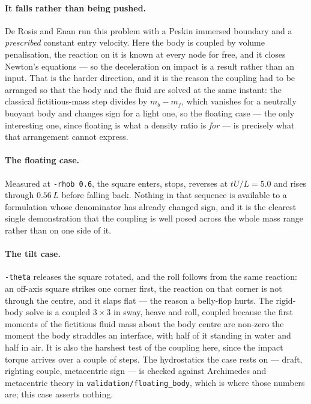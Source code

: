 \documentclass[11pt,a4paper]{article}
\newcommand{\code}[1]{\texttt{\small #1}}
\begin{document}
\paragraph{It falls rather than being pushed.} De Rosis and Enan run this
problem with a Peskin immersed boundary and a \emph{prescribed} constant entry
velocity. Here the body is coupled by volume penalisation, the reaction on it is
known at every node for free, and it closes Newton's equations --- so the
deceleration on impact is a result rather than an input. That is the harder
direction, and it is the reason the coupling had to be arranged so that the body
and the fluid are solved at the same instant: the classical fictitious-mass step
divides by $m_b - m_f$, which vanishes for a neutrally buoyant body and changes
sign for a light one, so the floating case --- the only interesting one, since
floating is what a density ratio is \emph{for} --- is precisely what that
arrangement cannot express.

\paragraph{The floating case.} Measured at \code{-rhob 0.6}, the square enters,
stops, reverses at $tU/L = 5.0$ and rises through $0.56\,L$ before falling back.
Nothing in that sequence is available to a formulation whose denominator has
already changed sign, and it is the clearest single demonstration that the
coupling is well posed across the whole mass range rather than on one side of
it.

\paragraph{The tilt case.} \code{-theta} releases the square rotated, and the
roll follows from the same reaction: an off-axis square strikes one corner
first, the reaction on that corner is not through the centre, and it slaps flat
--- the reason a belly-flop hurts. The rigid-body solve is a coupled $3\times3$
in sway, heave and roll, coupled because the first moments of the fictitious
fluid mass about the body centre are non-zero the moment the body straddles an
interface, with half of it standing in water and half in air. It is also the
harshest test of the coupling here, since the impact torque arrives over a
couple of steps. The hydrostatics the case rests on --- draft, righting couple,
metacentric sign --- is checked against Archimedes and metacentric theory in
\code{validation/floating\_body}, which is where those numbers are; this case
asserts nothing.
\end{document}
